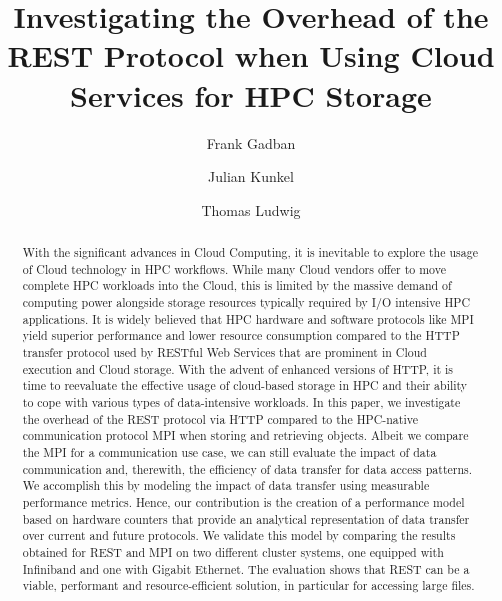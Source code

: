 \documentclass[runningheads]{llncs}
\begin{document}
\title{Investigating the Overhead of the REST Protocol when Using Cloud Services for HPC Storage} 
\author{Frank Gadban \and Julian Kunkel \and Thomas Ludwig}

\maketitle     
  
\begin{abstract}
With the significant advances in Cloud Computing, it is inevitable to explore the usage of Cloud technology in HPC workflows. While many Cloud vendors offer to move complete HPC workloads into the Cloud, this is limited by the massive demand of computing power alongside storage resources typically required by I/O intensive HPC applications. It is widely believed that HPC hardware and software protocols like MPI yield superior performance and lower resource consumption compared to the HTTP transfer protocol used by RESTful Web Services that are prominent in Cloud execution and Cloud storage. With the advent of enhanced versions of HTTP, it is time to reevaluate the effective usage of cloud-based storage in HPC and their ability to cope with various types of data-intensive workloads. 
In this paper, we investigate the overhead of the REST protocol via HTTP compared to the HPC-native communication protocol MPI when storing and retrieving objects. Albeit we compare the MPI for a communication use case, we can still evaluate the impact of data communication and, therewith, the efficiency of data transfer for data access patterns. We accomplish this by modeling the impact of data transfer using measurable performance metrics. Hence, our contribution is the creation of a performance model based on hardware counters that provide an analytical representation of data transfer over current and future protocols. We validate this model by comparing the results obtained for REST and MPI on two different cluster systems, one equipped with Infiniband and one with Gigabit Ethernet. The evaluation shows that REST can be a viable, performant and resource-efficient solution, in particular for accessing large files. 
\end{abstract}
%
%
%
\end{document}
